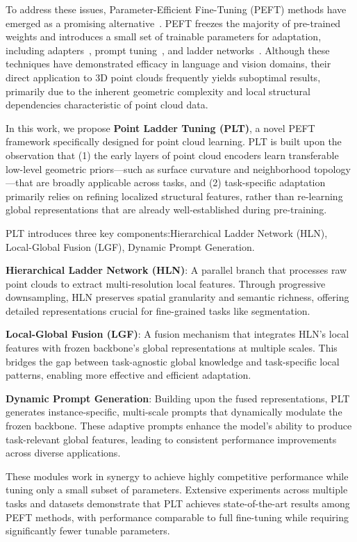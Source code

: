 To address these issues, Parameter-Efficient Fine-Tuning (PEFT) methods have emerged as a promising alternative~\cite{houlsby2019parameter, jie2023fact, karimi2021compacter}. PEFT freezes the majority of pre-trained weights and introduces a small set of trainable parameters for adaptation, including adapters~\cite{houlsby2019parameter}, prompt tuning~\cite{li2021prefix}, and ladder networks~\cite{sung2022lst}. Although these techniques have demonstrated efficacy in language and vision domains, their direct application to 3D point clouds frequently yields suboptimal results, primarily due to the inherent geometric complexity and local structural dependencies characteristic of point cloud data.

In this work, we propose \textbf{Point Ladder Tuning (PLT)}, a novel PEFT framework specifically designed for point cloud learning. PLT is built upon the observation that (1) the early layers of point cloud encoders learn transferable low-level geometric priors—such as surface curvature and neighborhood topology—that are broadly applicable across tasks, and (2) task-specific adaptation primarily relies on refining localized structural features, rather than re-learning global representations that are already well-established during pre-training.

PLT introduces three key components:Hierarchical Ladder Network (HLN), Local-Global Fusion (LGF), Dynamic Prompt Generation.

\textbf{Hierarchical Ladder Network (HLN)}: A parallel branch that processes raw point clouds to extract multi-resolution local features. Through progressive downsampling, HLN preserves spatial granularity and semantic richness, offering detailed representations crucial for fine-grained tasks like segmentation.

\textbf{Local-Global Fusion (LGF)}: A fusion mechanism that integrates HLN's local features with frozen backbone's global representations at multiple scales. This bridges the gap between task-agnostic global knowledge and task-specific local patterns, enabling more effective and efficient adaptation.

\textbf{Dynamic Prompt Generation}: Building upon the fused representations, PLT generates instance-specific, multi-scale prompts that dynamically modulate the frozen backbone. These adaptive prompts enhance the model's ability to produce task-relevant global features, leading to consistent performance improvements across diverse applications.

These modules work in synergy to achieve highly competitive performance while tuning only a small subset of parameters. Extensive experiments across multiple tasks and datasets demonstrate that PLT achieves state-of-the-art results among PEFT methods, with performance comparable to full fine-tuning while requiring significantly fewer tunable parameters.

